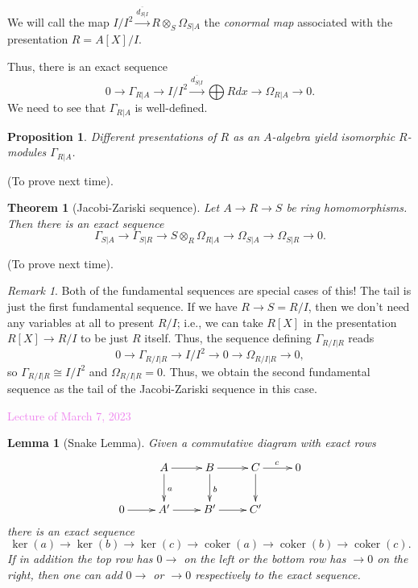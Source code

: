 \documentclass{amsart}[12pt]
\def\ker{\operatorname{ker}}
\def\coker{\operatorname{coker}}
\newcommand{\Mar}[1]{\textcolor{violet}{Lecture of March #1, 2023}}
\numberwithin{equation}{section}
\theoremstyle{plain} %
\newtheorem{thm}[equation]{Theorem}
\newtheorem{lem}[equation]{Lemma}
\newtheorem{prop}[equation]{Proposition}
\theoremstyle{definition}
\theoremstyle{remark}
\newtheorem{rem}[equation]{Remark}
\newcommand{\xra}[1]{\xrightarrow{#1}}
\begin{document}
We will call the map $I/I^2 \xra{\overline{d_{S|I}}} R\otimes_S \Omega_{S|A}$ the \emph{conormal map} associated with the presentation $R=A[X]/I$.

Thus, there is an exact sequence
\[ 0 \to \Gamma_{R|A} \to I/I^2 \xra{\overline{d_{S|I}}} \bigoplus R dx \to \Omega_{R|A} \to 0.\]
We need to see that $\Gamma_{R|A}$ is well-defined.

\begin{prop} Different presentations of $R$ as an $A$-algebra yield isomorphic $R$-modules $\Gamma_{R|A}$.
\end{prop}

(To prove next time).

\begin{thm}[Jacobi-Zariski sequence]
Let $A\to R \to S$ be ring homomorphisms. Then there is an exact sequence
\[ \Gamma_{S|A} \to \Gamma_{S|R} \to S\otimes_R \Omega_{R|A} \to \Omega_{S|A} \to \Omega_{S|R} \to 0.\]
\end{thm}

(To prove next time).


\begin{rem}
Both of the fundamental sequences are special cases of this! The tail is just the first fundamental sequence. If we have $R\to S=R/I$, then we don't need any variables at all to present $R/I$; i.e., we can take $R[X]$ in the presentation $R[X]\to R/I$ to be just $R$ itself. Thus, the sequence defining $\Gamma_{R/I | R}$ reads
\[ 0 \to \Gamma_{R/I | R} \to  I/I^2 \to 0 \to \Omega_{R/I | R} \to 0,\]
so $\Gamma_{R/I | R}\cong I/I^2$ and $\Omega_{R/I | R}=0$. Thus, we obtain the second fundamental sequence as
the tail of the Jacobi-Zariski sequence in this case.
\end{rem}

\Mar{7}

\begin{lem}[Snake Lemma]
Given a commutative diagram with exact rows
\[ \xymatrix{ & A \ar[r] \ar[d]^{a} & B \ar[r] \ar[d]^{b}& C \ar[r]^{c} \ar[d]& 0 \\ 0\ar[r]& A' \ar[r] & B' \ar[r] & C'  & }\]
there is an exact sequence
\[  \ker(a) \to \ker(b) \to \ker(c) \to \coker(a)\to \coker(b) \to \coker(c).\]
If in addition the top row has $0\to$ on the left or the bottom row has $\to 0$ on the right, then one can add $0\to$ or $\to 0$ respectively to the exact sequence.
\end{lem}
\end{document}
